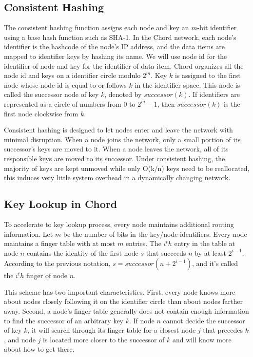 \documentclass[letterpaper,twocolumn,10pt]{article}
\begin{document}
\subsection{Consistent Hashing}

The consistent hashing function assigns each node and key an $m$-bit identifier using a base hash function such as SHA-1. In the Chord network, each node's identifier is the hashcode of the node's IP address, and the data items are mapped to identifier keys by hashing its name. We will use node id for the identifier of node and key for the identifier of data item. Chord organizes all the node id and keys on a identifier circle modulo $2^{m}$. Key $k$ is assigned to the first node whose node id is equal to or follows $k$ in the identifier space. This node is called the successor node of key $k$, denoted by $successor(k)$. If identifiers are represented as a circle of numbers from 0 to $2^{m} - 1$, then $successor(k)$ is the first node clockwise from $k$.

Consistent hashing is designed to let nodes enter and leave the network with minimal disruption. When a node joins the network, only a small portion of its successor's keys are moved to it. When a node leaves the network, all of its responsible keys are moved to its successor. Under consistent hashing, the majority of keys are kept unmoved while only O(k/n) keys need to be reallocated, this induces very little system overhead in a dynamically changing network.

\subsection{Key Lookup in Chord}

To accelerate to key lookup process, every node maintains additional routing information. Let $m$ be the number of bits in the key/node identifiers. Every node maintains a finger table with at most $m$ entries. The $i^th$ entry in the table at node $n$ contains the identity of the first node $s$ that succeeds $n$ by at least $2^{i-1}$. According to the previous notation, $s = successor(n + 2^{i-1})$, and it's called the $i^th$ finger of node $n$.

This scheme has two important characteristics. First, every node knows more about nodes  closely following it on the identifier circle than about nodes farther away. Second, a node's finger table generally does not contain enough information to find the successor of an arbitrary key $k$. If node $n$ cannot decide the successor of key $k$, it will search through its finger table for a closest node $j$ that precedes $k$, and node $j$ is located more closer to the successor of $k$ and will know more about how to get there.
\end{document}
